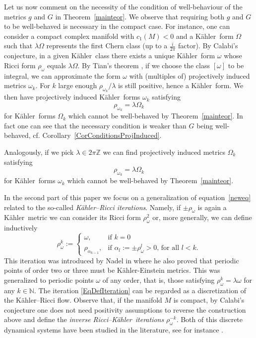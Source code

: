 \documentclass[12pt]{amsart}
\newcommand{\Z}{\mathbb{Z}}
\newcommand{\N}{\mathbb{N}}
\newcommand{\K}{K\"{a}hler}
\begin{document}
Let us  now comment on the necessity of the condition of well-behaviour of the metrics $g$ and $G$ in Theorem~\ref{mainteor}.
We observe that requiring both  $g$ and $G$ to be well-behaved is necessary in the compact case.
For instance, one can consider a compact complex manifold with $c_1(M)<0$ and a \K\ form $\Omega$ such that $\lambda\Omega$ represents the first Chern class (up to a $\frac{i}{2\pi}$ factor).
By Calabi's conjecture, in a given \K\ class there exists a unique \K\ form $\omega$ whose Ricci form $\rho_\omega$ equals $\lambda\Omega$.
By Tian's theorem \cite{Tian90Approximation}, if we choose the class $[\omega]$ to be integral, we can approximate the form $\omega$ with (multiples of) projectively induced metrics $\omega_k$.
For $k$ large enough $\rho_{\omega_k}/\lambda$ is still positive, hence a \K\ form. 
We then have projectively induced \K\ forms $\omega_k$ satisfying
$$\rho_{\omega_k}=\lambda\Omega_k$$
for \K\ forms $\Omega_k$ which cannot be well-behaved by Theorem~\ref{mainteor}.
In fact one can see that the necessary condition is weaker than $G$ being well-behaved, cf. Corollary~\ref{CorConditionsProjInduced}.

Analogously, if we pick $\lambda\in2\pi\Z$ we can find projectively induced metrics $\Omega_k$ satisfying
$$\rho_{\omega_k}=\lambda\Omega_k$$
for \K\ forms $\omega_k$ which cannot be well-behaved by Theorem~\ref{mainteor}.




	

	\vspace{0.3cm}
	
In the second part of this paper we focus on a generalization of equation~\eqref{neweq} related to the so-called \textit{\K--Ricci iterations}. Namely, if $\pm \rho_\omega$ is again a  \K\ metric we can consider its Ricci form $\rho^2_\omega$ or, more generally, we can define inductively
\begin{equation}\label{EqDefIteration}
\rho^k_\omega:=\begin{cases}
	\omega, & \text{if } k=0\\
	\rho_{\alpha_{k-1}}, & \text{if $\alpha_{l}:=\pm\rho^{l}_\omega>0$, for all $l<k$}.
\end{cases}
\end{equation}
This iteration was introduced by Nadel in \cite{Nadel95RicciIterations} where he also proved that periodic points of order two or three must be K\"ahler-Einstein metrics.
This was generalized \cite{Keller09RicciIterations,Rubinstein08ConvergenceRicciIteration} to periodic points $\omega$ of any order, that is, those satisfying $\rho^k_\omega=\lambda\omega$ for any $k\in\N$.
The iteration \eqref{EqDefIteration} can be regarded as a discretization of the \K--Ricci flow.
Observe that, if the manifold $M$ is compact, by Calabi's conjecture one does not need positivity assumptions to reverse the construction above and define the  \textit{inverse Ricci--\K\ iterations} $\rho^{-k}_\omega$.
Both of this discrete dynamical systems have been studied in the literature, see for instance \cite{Berman19ConvergenceRicciIteration,DarvasRubinstein19ConvergenceRicciIterations}.
\end{document}
